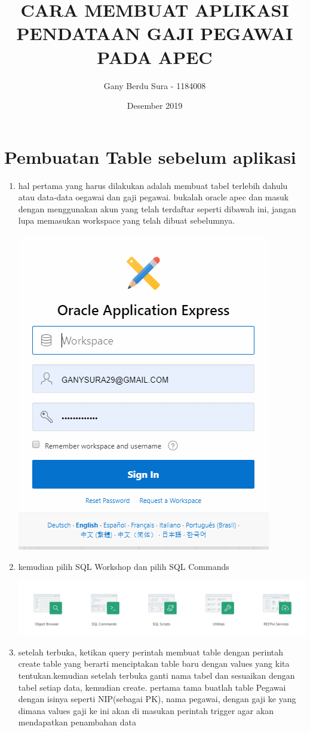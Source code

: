 \documentclass{article}
\title{CARA MEMBUAT APLIKASI PENDATAAN GAJI PEGAWAI PADA APEC}
\author{Gany Berdu Sura - 1184008 }
\date{Desember 2019}
\begin{document}
\maketitle
\section{Pembuatan Table sebelum aplikasi}
\begin{enumerate}
    \item hal pertama yang harus dilakukan adalah membuat tabel terlebih dahulu atau data-data oegawai dan gaji pegawai.
    bukalah oracle apec dan masuk dengan menggunakan akun yang telah terdaftar seperti dibawah ini, jangan lupa memasukan workspace yang telah dibuat sebelumnya.
    \begin{center}
    \includegraphics[width=.6\textwidth]{gambar/satu.PNG}
    \end{center}
    \item kemudian pilih SQL Workshop dan pilih SQL Commands
    \begin{center}
    \includegraphics[width=.6\textwidth]{gambar/dua.PNG}
    \end{center}
    \item setelah terbuka, ketikan query perintah membuat table dengan perintah create table yang berarti menciptakan table baru dengan values yang kita tentukan.kemudian setelah terbuka ganti nama tabel dan sesuaikan dengan tabel setiap data, kemudian create. pertama tama buatlah table Pegawai dengan isinya seperti NIP(sebagai PK), nama pegawai, dengan gaji ke yang dimana values gaji ke ini akan di masukan perintah trigger agar akan mendapatkan penambahan data

\end{enumerate}
\end{document}
